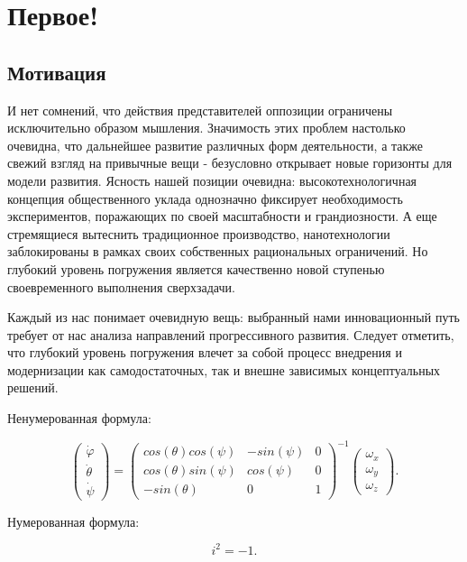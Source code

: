 \section{Первое!}
\subsection{Мотивация}
И нет сомнений, что действия представителей оппозиции ограничены исключительно образом мышления. Значимость этих проблем настолько очевидна, что дальнейшее развитие различных форм деятельности, а также свежий взгляд на привычные вещи - безусловно открывает новые горизонты для модели развития. Ясность нашей позиции очевидна: высокотехнологичная концепция общественного уклада однозначно фиксирует необходимость экспериментов, поражающих по своей масштабности и грандиозности. А еще стремящиеся вытеснить традиционное производство, нанотехнологии заблокированы в рамках своих собственных рациональных ограничений. Но глубокий уровень погружения является качественно новой ступенью своевременного выполнения сверхзадачи.

Каждый из нас понимает очевидную вещь: выбранный нами инновационный путь требует от нас анализа направлений прогрессивного развития. Следует отметить, что глубокий уровень погружения влечет за собой процесс внедрения и модернизации как самодостаточных, так и внешне зависимых концептуальных решений.

Ненумерованная формула:

\begin{equation}
    \begin{pmatrix} \dot{\varphi}\\ \dot{\theta} \\ \dot{\psi} \end{pmatrix}
    = \begin{pmatrix}
        cos(\theta)cos(\psi) & -sin(\psi) & 0 \\
        cos(\theta)sin(\psi) & cos(\psi)  & 0 \\
        -sin(\theta)         & 0         &  1
    \end{pmatrix}^{-1}
    \begin{pmatrix} \omega_x\\ \omega_y \\ \omega_z \end{pmatrix}.
\end{equation}

Нумерованная формула:

\begin{equation}
    i^2 = -1.
    \label{eq:my_ref}
\end{equation}

